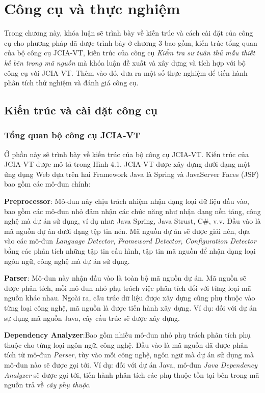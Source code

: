 \documentclass[12pt]{report}
\begin{document}
\chapter{Công cụ và thực nghiệm}
Trong chương này, khóa luận sẽ trình bày về kiến trúc và cách cài đặt của công cụ cho phương pháp đã được trình bày ở chương 3 bao gồm, kiến trúc tổng quan của bộ công cụ JCIA-VT, kiến trúc của công cụ \textit{Kiểm tra sư tuân thủ mẫu thiết kế bên trong mã nguồn} mà khóa luận đề xuất và xây dựng và tích hợp với bộ công cụ với JCIA-VT. Thêm vào đó, đưa ra một số thực nghiệm để tiến hành phân tích thử nghiệm và đánh giá công cụ.

\newpage
\section{Kiến trúc và cài đặt công cụ}
\subsection{Tổng quan bộ công cụ JCIA-VT}
Ở phần này sẽ trình bày về kiến trúc của bộ công cụ JCIA-VT. Kiến trúc của JCIA-VT được mô tả trong Hình 4.1. JCIA-VT được xây dựng dưới dạng một ứng dụng Web dựa trên hai Framework Java là Spring và JavaServer Faces (JSF) bao gồm các mô-đun chính:

\noindent \textbf{Preprocessor}: Mô-đun này chịu trách nhiệm nhận dạng loại dữ liệu đầu vào, bao gồm các mô-đun nhỏ đảm nhận các chức năng như nhận dạng nền tảng, công nghệ mà dự án sử dụng, ví dụ như: Java Spring, Java Strust, C$\#$, v.v. Đầu vào là mã nguồn dự án dưới dạng tệp tin nén. Mã nguồn dự án sẽ được giải nén, dựa vào các mô-đun \textit{Language Detector}, \textit{Frameword Detector}, \textit{Configuration Detector} bằng các phân tích những tập tin cấu hình, tập tin mã nguồn để nhận dạng loại ngôn ngữ, công nghệ mà dự án sử dụng.

\noindent \textbf{Parser}: Mô-đun này nhận đầu vào là toàn bộ mã nguồn dự án. Mã nguồn sẽ được phân tích, mỗi mô-đun nhỏ phụ trách việc phân tích đối với từng loại mã nguồn khác nhau. Ngoài ra, cấu trúc dữ liệu được xây dựng cũng phụ thuộc vào từng loại công nghệ, mã nguồn là được tiến hành xây dựng. Ví dụ: đối với dự án sự dụng mã nguồn Java, cây cấu trúc sẽ được xây dựng.

\noindent \textbf{Dependency Analyzer}:Bao gồm nhiều mô-đun nhỏ phụ trách phân tích phụ thuộc cho từng loại ngôn ngữ, công nghệ. Đầu vào là mã nguồn đã được phân tích từ mô-đun \textit{Parser}, tùy vào mỗi công nghệ, ngôn ngữ mà dự án sử dụng mà mô-đun nào sẽ được gọi tới. Ví dụ: đối với dự án Java, mô-đun \textit{Java Dependency Analyzer} sẽ được gọi tới, tiến hành phân tích các phụ thuộc tồn tại bên trong mã nguồn trả về \textit{cây phụ thuộc}.
\end{document}
